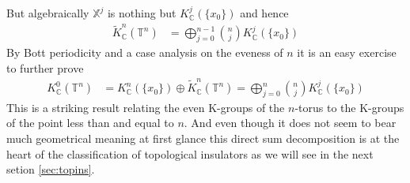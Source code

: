 But algebraically $\mathbb{X}^{j}$ is nothing but $K_{\mathbb{C}}^{j}(\lbrace x_{0} \rbrace)$ and hence
\begin{align*}
  \tilde{K}_{\mathbb{C}}^{n}(\mathbb{T}^{n})
  &=
  \bigoplus_{j=0}^{n-1}
  \binom{n}{j}
  K_{\mathbb{C}}^{j}(\lbrace x_{0} \rbrace)
\end{align*}
By Bott periodicity and a case analysis on the eveness of $n$ it is an easy exercise to further prove
\begin{align*}
  K_{\mathbb{C}}^{0}(\mathbb{T}^{n})
  &=
  K_{\mathbb{C}}^{n}(\{ x_{0} \})
  \oplus
  \tilde{K}_{\mathbb{C}}^{n}(\mathbb{T}^{n})
  =
  \bigoplus_{j=0}^{n}
  \binom{n}{j}
  K_{\mathbb{C}}^{j}(\lbrace x_{0} \rbrace)
\end{align*}
This is a striking result relating the even K-groups of the $n$-torus to the K-groups of the point less than and equal to $n$. And even though it does not seem to bear much geometrical meaning at first glance this direct sum decomposition is at the heart of the classification of topological insulators as we will see in the next setion \ref{sec:topins}.
